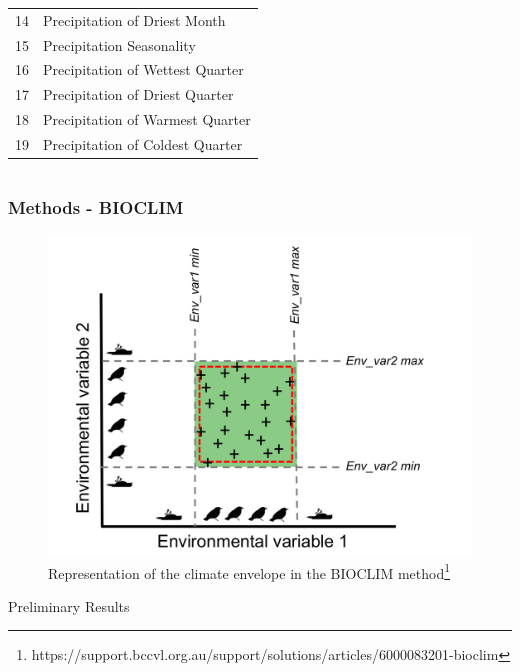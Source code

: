 \documentclass[10pt]{beamer}
\begin{document}
\begin{frame}
\begin{columns}
\begin{column}{0.5\textwidth}
{\begin{table}
\begin{tabular}{c l}
          14       & Precipitation of Driest Month          \\
          15       & Precipitation Seasonality              \\
          16       & Precipitation of Wettest Quarter       \\
          17       & Precipitation of Driest Quarter        \\
          18       & Precipitation of Warmest Quarter       \\
          19       & Precipitation of Coldest Quarter       \\
          \hline
        \end{tabular}
      \end{table}
    }
    \end{column}
  \end{columns}
\end{frame}

\begin{frame}
  \frametitle{Methods - BIOCLIM}
  \begin{figure}
    \centering
    \hspace*{-0cm}\includegraphics[scale=0.25]{fig/bioclim_bccvl.png}
    \caption{Representation of the climate envelope in the BIOCLIM method\footnote{\tiny https://support.bccvl.org.au/support/solutions/articles/6000083201-bioclim}}
  \end{figure}
\end{frame}

\begin{frame}
  \vfill
  \centering
  \huge Preliminary Results
  \vfill
\end{frame}
\end{document}
